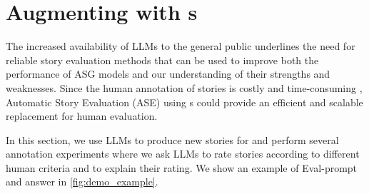 \section{Augmenting {\hanna} with {\llmfull}s}
\label{sec:hanna_v2}

The increased availability of LLMs to the general public underlines the need for reliable story evaluation methods that can be used to improve both the performance of ASG models and our understanding of their strengths and weaknesses. Since the human annotation of stories is costly and time-consuming \citep{celikyilmaz2020evaluation}, Automatic Story Evaluation (ASE) using {\llm}s could provide an efficient and scalable replacement for human evaluation.

In this section, we use LLMs to produce new stories for {\hanna} and perform several annotation experiments where we ask LLMs to rate stories according to different human criteria and to explain their rating. We show an example of Eval-prompt and answer in \autoref{fig:demo_example}.

